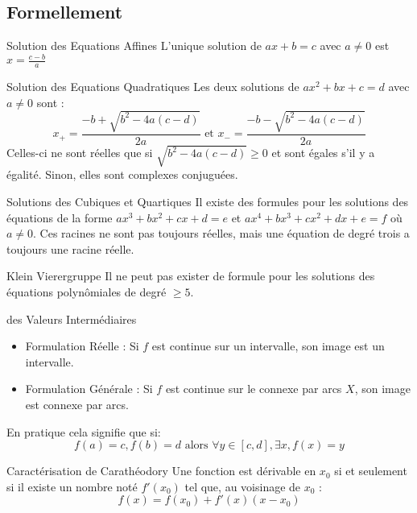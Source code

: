\documentclass{cours}
\begin{document}
\subsection{Formellement}
\vspace{-5pt}
\begin{théorème}{Solution des Equations Affines}{}
L'unique solution de $ax + b = c$ avec $a \neq 0$ est $x = \frac{c - b}{a}$
\end{théorème}
\vspace{-8pt}
\begin{théorème}{Solution des Equations Quadratiques}{}
Les deux solutions de $ax^{2} + bx + c = d$ avec $a \neq 0$ sont :
\vspace{-6pt}
\[
    x_{+} = \frac{- b + \sqrt{b^{2} - 4a(c - d)}}{2a} \text{ et } x_{-} = \frac{- b - \sqrt{b^{2} - 4a(c - d)}}{2a}
\]
Celles-ci ne sont réelles que si $\sqrt{b^{2} - 4a(c - d)} \geq 0$ et sont égales s'il y a égalité. Sinon, elles sont complexes conjuguées.
\end{théorème}
\begin{théorème}{Solutions des Cubiques et Quartiques}{}
Il existe des formules pour les solutions des équations de la forme $ax^{3} + bx^{2} + cx + d = e$ et $ax^{4} + bx^{3} + cx^{2} + dx + e = f$ où $a \neq 0$. Ces racines ne sont pas toujours réelles, mais une équation de degré trois a toujours une racine réelle.
\end{théorème}
\begin{théorème}{Klein Vierergruppe}{}
Il ne peut pas exister de formule pour les solutions des équations polynômiales de degré $\geq 5$.
\end{théorème}
\begin{théorème}{des Valeurs Intermédiaires}{}
    \begin{itemize}
        \item Formulation Réelle : Si $f$ est continue sur un intervalle, son image est un intervalle.
        \item Formulation Générale : Si $f$ est continue sur le connexe par arcs $X$, son image est connexe par arcs.
    \end{itemize}
    \end{théorème}
    En pratique cela signifie que si:
    \[
        f(a) = c, f(b) = d \text{ alors } \forall y \in \left[c, d\right], \exists x, f(x) = y
    \]

    \begin{théorème}{Caractérisation de Carathéodory}{}
        Une fonction est dérivable en $x_{0}$ si et seulement si il existe un nombre noté $f'(x_{0})$ tel que, au voisinage de $x_{0}$ :
        \[
            f(x) = f(x_{0}) + f'(x)(x- x_{0})
        \]
        \end{théorème}
\end{document}
